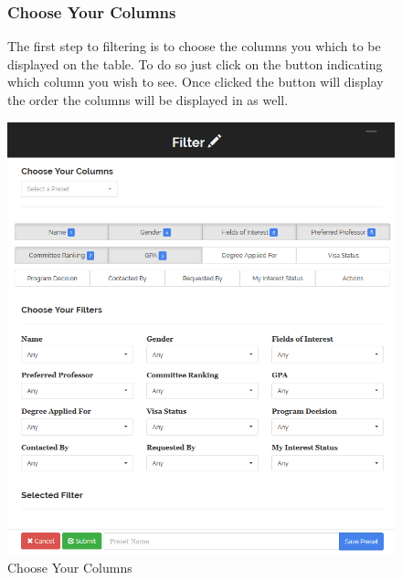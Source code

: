 \documentclass[fontsize=12pt,paper=letter,twoside]{scrartcl}
\begin{document}
\clearpage
\begin{figure}[!htb]
\subsubsection{Choose Your Columns}
The first step to filtering is to choose the columns you which to be displayed on the table. To do so just click on the button indicating which column you wish to see. Once clicked the button will display the order the columns will be displayed in as well.
\begin{center}
\includegraphics[width=.99\textwidth]{images/choose_columns.png}
\end{center}
\caption{Choose Your Columns}
\label{fig:choose_columns}
\end{figure}

\clearpage
\end{document}
